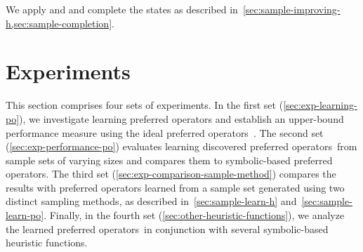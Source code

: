 \documentclass[ppgc,diss,english]{iiufrgs}
\begin{document}
We apply \sai and \sui and complete the states as described in~\cref{sec:sample-improving-h,sec:sample-completion}.


%
%
\chapter{Experiments}
\label{cha:exp-experiments}
This section comprises four sets of experiments. In the first set (\cref{sec:exp-learning-po}), we investigate learning preferred operators and establish an upper-bound performance measure using the ideal preferred operators~\postar. The second set (\cref{sec:exp-performance-po}) evaluates learning discovered preferred operators~\pog from sample sets of varying sizes and compares them to symbolic-based preferred operators. The third set (\cref{sec:exp-comparison-sample-method}) compares the results with preferred operators learned from a sample set generated using two distinct sampling methods, as described in~\cref{sec:sample-learn-h} and~\cref{sec:sample-learn-po}. Finally, in the fourth set (\cref{sec:other-heuristic-functions}), we analyze the learned preferred operators~\pog in conjunction with several symbolic-based heuristic functions.
\end{document}

